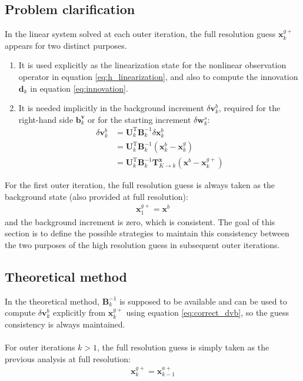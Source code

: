 \documentclass[12pt]{scrartcl}
\begin{document}
\subsection{Problem clarification}
In the linear system solved at each outer iteration, the full resolution guess $\mathbf{x}^{g+}_k$ appears for two distinct purposes.
\begin{enumerate}
\item It is used explicitly as the linearization state for the nonlinear observation operator in equation \eqref{eq:h_linearization}, and also to compute the innovation $\mathbf{d}_k$ in equation \eqref{eq:innovation}.
\item It is needed implicitly in the background increment $\delta \mathbf{v}^b_k$, required for the right-hand side $\mathbf{b}^\mathbf{v}_k$ or for the starting increment $\delta \mathbf{w}^s_k$:
\begin{align}
\label{eq:correct_dvb}
\delta \mathbf{v}^b_k & = \mathbf{U}_k^\mathrm{T} \mathbf{B}^{-1}_k \delta \mathbf{x}^b_k \nonumber \\
& = \mathbf{U}_k^\mathrm{T} \mathbf{B}^{-1}_k \left(\mathbf{x}^b_k - \mathbf{x}^g_k\right)  \nonumber \\
& = \mathbf{U}_k^\mathrm{T} \mathbf{B}^{-1}_k \mathbf{T}^\mathbf{x}_{K \rightarrow k} \left(\mathbf{x}^b - \mathbf{x}^{g+}_k\right)
\end{align}
\end{enumerate}
For the first outer iteration, the full resolution guess is always taken as the background state (also provided at full resolution):
\begin{align}
\label{eq:usual_full_res_first}
\mathbf{x}^{g+}_1 = \mathbf{x}^b
\end{align}
and the background increment is zero, which is consistent. The goal of this section is to define the possible strategies to maintain this consistency between the two purposes of the high resolution guess in subsequent outer iterations.

\subsection{Theoretical method}
In the theoretical method, $\mathbf{B}_k^{-1}$ is supposed to be available and can be used to compute $\delta \mathbf{v}^b_k$ explicitly from $\mathbf{x}^{g+}_k$ using equation \eqref{eq:correct_dvb}, so the guess consistency is always maintained.\\
$  $\\
For outer iterations $k>1$, the full resolution guess is simply taken as the previous analysis at full resolution:
\begin{align}
\label{eq:usual_full_res}
\mathbf{x}^{g+}_k = \mathbf{x}^{a+}_{k-1}
\end{align}
\end{document}
